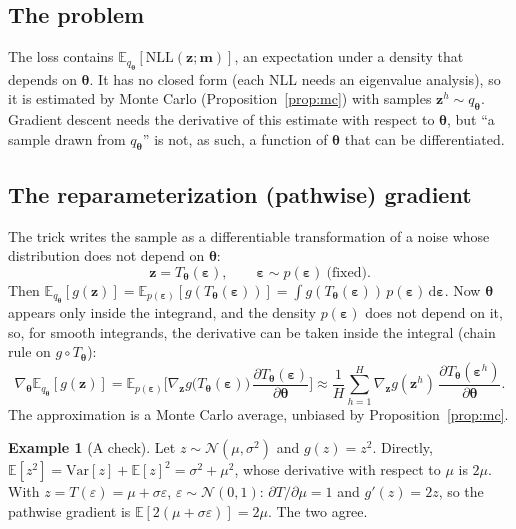 \documentclass[11pt,a4paper]{article}
\numberwithin{equation}{section}
\theoremstyle{plain}
\theoremstyle{definition}
\newtheorem{example}[proposition]{Example}
\theoremstyle{remark}
\newcommand{\m}{\mathbf{m}}
\newcommand{\z}{\mathbf{z}}
\newcommand{\eps}{\bm{\varepsilon}}
\newcommand{\thetab}{\bm{\theta}}
\newcommand{\E}{\mathbb{E}}
\newcommand{\Var}{\mathrm{Var}}
\newcommand{\NLL}{\mathrm{NLL}}
\newcommand{\N}{\mathcal{N}}
\newcommand{\dd}{\,\mathrm{d}}
\newcommand{\qth}{q_{\bm{\theta}}}
\begin{document}
\subsection{The problem}
The loss contains $\E_{\qth}[\NLL(\z;\m)]$, an expectation under a density that depends on $\thetab$. It has no closed form (each NLL needs an eigenvalue analysis), so it is estimated by Monte Carlo (Proposition~\ref{prop:mc}) with samples $\z^h\sim\qth$. Gradient descent needs the derivative of this estimate with respect to $\thetab$, but ``a sample drawn from $\qth$'' is not, as such, a function of $\thetab$ that can be differentiated.

\subsection{The reparameterization (pathwise) gradient}
The trick \cite{kingma2014vae,rezende2014,mohamed2020mcgrad} writes the sample as a differentiable transformation of a noise whose distribution does not depend on $\thetab$:
\begin{equation}
\z=T_{\thetab}(\eps),\qquad\eps\sim p(\eps)\ \text{(fixed)}.
\end{equation}
Then $\E_{\qth}[g(\z)]=\E_{p(\eps)}[g(T_{\thetab}(\eps))]=\int g(T_{\thetab}(\eps))\,p(\eps)\dd\eps$. Now $\thetab$ appears only inside the integrand, and the density $p(\eps)$ does not depend on it, so, for smooth integrands, the derivative can be taken inside the integral (chain rule on $g\circ T_{\thetab}$):
\begin{equation}
\nabla_{\thetab}\E_{\qth}[g(\z)]=\E_{p(\eps)}\Big[\nabla_{\z}g\big(T_{\thetab}(\eps)\big)\,\frac{\partial T_{\thetab}(\eps)}{\partial\thetab}\Big]
\approx\frac1H\sum_{h=1}^H\nabla_{\z}g(\z^h)\,\frac{\partial T_{\thetab}(\eps^h)}{\partial\thetab}.
\end{equation}
The approximation is a Monte Carlo average, unbiased by Proposition~\ref{prop:mc}.

\begin{example}[A check]
Let $z\sim\N(\mu,\sigma^2)$ and $g(z)=z^2$. Directly, $\E[z^2]=\Var[z]+\E[z]^2=\sigma^2+\mu^2$, whose derivative with respect to $\mu$ is $2\mu$. With $z=T(\varepsilon)=\mu+\sigma\varepsilon$, $\varepsilon\sim\N(0,1)$: $\partial T/\partial\mu=1$ and $g'(z)=2z$, so the pathwise gradient is $\E[2(\mu+\sigma\varepsilon)]=2\mu$. The two agree.
\end{example}
\end{document}
